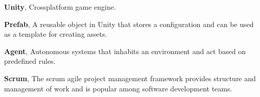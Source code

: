 \noindent
\label{itm:unity}\textbf{Unity}, Crossplatform game engine.

\noindent
\label{itm:prefab}\textbf{Prefab}, A reusable object in Unity that stores a configuration and can be used as a template for creating assets.

\noindent
\label{itm:agent}\textbf{Agent}, Autonomous systems that inhabits an environment and act based on predefined rules.

\noindent
\label{itm:scrum}\textbf{Scrum}, The scrum agile project management framework provides structure and management of work and is popular among software development teams.